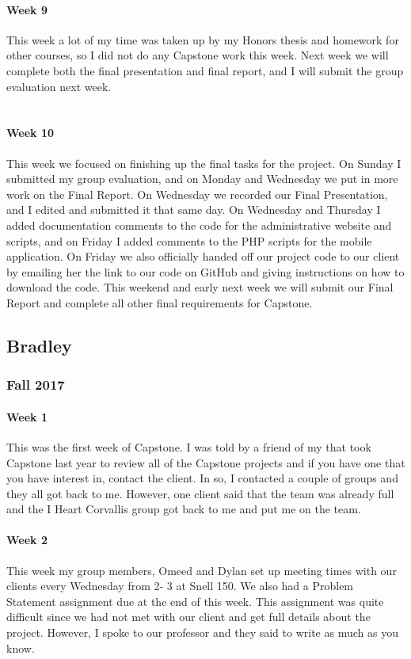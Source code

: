 \documentclass[onecolumn, draftclsnofoot,10pt, compsoc]{IEEEtran}
\begin{document}
      \paragraph{Week 9}
      This week a lot of my time was taken up by my Honors thesis and homework for other courses, so I did not do any Capstone work this week. Next week we will complete both the final presentation and final report, and I will submit the group evaluation next week. \\ \\

      \paragraph{Week 10}
      This week we focused on finishing up the final tasks for the project. On Sunday I submitted my group evaluation, and on Monday and Wednesday we put in more work on the Final Report. On Wednesday we recorded our Final Presentation, and I edited and submitted it that same day. On Wednesday and Thursday I added documentation comments to the code for the administrative website and scripts, and on Friday I added comments to the PHP scripts for the mobile application. On Friday we also officially handed off our project code to our client by emailing her the link to our code on GitHub and giving instructions on how to download the code. This weekend and early next week we will submit our Final Report and complete all other final requirements for Capstone.
      \newpage

  \subsection{Bradley}
    \subsubsection{Fall 2017}
      \paragraph{Week 1}
      This was the first week of Capstone. I was told by a friend of my that took Capstone last year to review all of the Capstone projects and if you have one that you have interest in, contact the client. In so, I contacted a couple of groups and they all got back to me. However, one client said that the team was already full and the I Heart Corvallis group got back to me and put me on the team.

      \paragraph{Week 2}
      This week my group members, Omeed and Dylan set up meeting times with our clients every Wednesday from 2- 3 at Snell 150. We also had a Problem Statement assignment due at the end of this week. This assignment was quite difficult since we had not met with our client and get full details about the project. However, I spoke to our professor and they said to write as much as you know.
\end{document}
